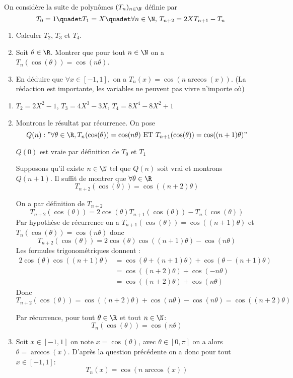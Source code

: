 \documentclass[a4paper, 11pt,reqno]{article}
\begin{document}
\begin{exercice}
On considère la suite de polynômes $(T_n)_{n\in \N}$ définie par 
$$ T_0=1 \quadet T_1=X \quadet \forall n\in \N,\, T_{n+2}=2X T_{n+1}-T_n$$
\begin{enumerate}

\item Calculer $T_2$, $T_3$ et $T_4$.

\item Soit $\theta \in \R$. Montrer que pour tout $n\in \N$ on  a  $T_n(\cos(\theta)) =\cos(n\theta)$.
\item En déduire que $\forall x\in [-1,1], $ on a $T_n(x) =\cos(n \arccos(x))$. (La rédaction est importante, les variables ne peuvent pas vivre n'importe où)

\end{enumerate}
\end{exercice}
\begin{correction}
\begin{enumerate}

\item $T_2 = 2X^2-1$, $T_3 =4X^3-3X$, $T_4 = 8X^4 -8X^2+1 $


\item Montrons le résultat par récurrence. On pose 
$$Q(n) : " \forall \theta\in \R, T_n(\cos(\theta)) =\cos(n\theta)  \text{ ET } T_{n+1}(\cos(\theta)) =\cos((n+1)\theta)"$$

$Q(0)$ est vraie par définition de $T_0 $ et $T_1$ 

Supposons qu'il existe $n\in \N$ tel que $Q(n)$ soit vrai et montrons $Q(n+1)$. Il suffit de montrer que $\forall \theta \in \R$
$$T_{n+2}(\cos(\theta) )=\cos((n+2)\theta)$$

On a par définition de $T_{n+2}$ 
$$T_{n+2} (\cos(\theta))  = 2\cos(\theta) T_{n+1}(\cos(\theta)) -T_n(\cos(\theta))$$
Par hypothèse de récurrence on a 
$T_{n+1}(\cos(\theta)) =\cos((n+1)\theta)$ et 
$T_{n}(\cos(\theta))=\cos(n\theta) $ donc  
$$T_{n+2} (\cos(\theta)) =2 \cos(\theta) \cos((n+1) \theta) - \cos(n \theta)$$
Les formules trigonométriques donnent : 
\begin{align*}
2 \cos(\theta) \cos((n+1) \theta)   &=\cos(\theta+(n+1) \theta) +\cos(\theta-(n+1) \theta)\\
&=\cos((n+2) \theta) + \cos(-n\theta)\\
&=\cos((n+2) \theta) + \cos(n\theta)
\end{align*}
Donc 
$$T_{n+2} (\cos(\theta))  = \cos((n+2) \theta) + \cos(n\theta)-\cos(n\theta) = \cos((n+2)\theta)
$$


Par récurrence, pour tout $\theta \in \R$ et tout $n\in \N$: 
$$T_n(\cos(\theta ) ) =\cos(n\theta)$$


\item Soit $x\in [-1,1]$ on  note $x =\cos(\theta)$, avec $\theta \in [0,\pi]$ on a  alors 
$\theta =\arccos( x) $. D'après la question précédente on a donc pour tout $x\in [-1,1]$: 
$$T_n(x) = \cos( n \arccos(x))$$

\end{enumerate}
\end{correction}
\end{document}

